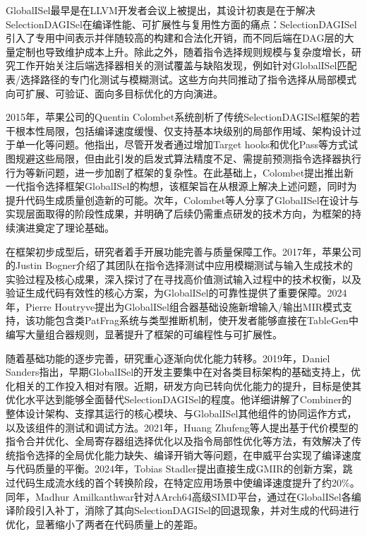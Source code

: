 \par

GlobalISel最早是在LLVM开发者会议上被提出，其设计初衷是在于解决SelectionDAGISel在编译性能、可扩展性与复用性方面的痛点：SelectionDAGISel引入了专用中间表示并伴随较高的构建和合法化开销，而不同后端在DAG层的大量定制也导致维护成本上升\cite{Colombet2015GlobalISel}。除此之外，随着指令选择规则规模与复杂度增长，研究工作开始关注后端选择器相关的测试覆盖与缺陷发现，例如针对GlobalISel匹配表/选择路径的专门化测试与模糊测试。这些方向共同推动了指令选择从局部模式向可扩展、可验证、面向多目标优化的方向演进\cite{rong2024irfuzzer}。

\par

2015年，苹果公司的Quentin Colombet系统剖析了传统SelectionDAGISel框架的若干根本性局限，包括编译速度缓慢、仅支持基本块级别的局部作用域、架构设计过于单一化等问题。他指出，尽管开发者通过增加Target hooks和优化Pass等方式试图规避这些局限，但由此引发的启发式算法精度不足、需提前预测指令选择器执行行为等新问题，进一步加剧了框架的复杂性。在此基础上，Colombet提出推出新一代指令选择框架GlobalISel的构想，该框架旨在从根源上解决上述问题，同时为提升代码生成质量创造新的可能\cite{Colombet2015GlobalISel}。次年，Colombet等人分享了GlobalISel在设计与实现层面取得的阶段性成果，并明确了后续仍需重点研发的技术方向\cite{Colombet2016GlobalISelDesign}，为框架的持续演进奠定了理论基础。

\par

在框架初步成型后，研究者着手开展功能完善与质量保障工作。2017年，苹果公司的Justin Bogner介绍了其团队在指令选择测试中应用模糊测试与输入生成技术的实验过程及核心成果，深入探讨了在寻找高价值测试输入过程中的技术权衡，以及验证生成代码有效性的核心方案\cite{Bogner2017ISelFuzzing}，为GlobalISel的可靠性提供了重要保障。2024年，Pierre Houtryve提出为GlobalISel组合器基础设施新增输入/输出MIR模式支持，该功能包含类PatFrag系统与类型推断机制，使开发者能够直接在TableGen中编写大量组合器规则\cite{Houtryve2024MIRPattern}，显著提升了框架的可编程性与可扩展性。

\par

随着基础功能的逐步完善，研究重心逐渐向优化能力转移。2019年，Daniel Sanders指出，早期GlobalISel的开发主要集中在对各类目标架构的基础支持上，优化相关的工作投入相对有限\cite{Sanders2019GlobalISelCombiner}。近期，研发方向已转向优化能力的提升，目标是使其优化水平达到能够全面替代SelectionDAGISel的程度。他详细讲解了Combiner的整体设计架构、支撑其运行的核心模块、与GlobalISel其他组件的协同运作方式，以及该组件的测试和调试方法。2021年，Huang Zhufeng等人提出基于代价模型的指令合并优化、全局寄存器组选择优化以及指令局部性优化等方法\cite{zhufeng2021optimization}，有效解决了传统指令选择的全局优化能力缺失、编译开销大等问题，在申威平台实现了编译速度与代码质量的平衡。2024年，Tobias Stadler提出直接生成GMIR的创新方案，跳过代码生成流水线的首个转换阶段，在特定应用场景中使编译速度提升了约20\%\cite{Stadler2024DirectGMIR}。同年，Madhur Amilkanthwar针对AArch64高级SIMD平台，通过在GlobalISel各编译阶段引入补丁，消除了其向SelectionDAGISel的回退现象，并对生成的代码进行优化，显著缩小了两者在代码质量上的差距\cite{Amilkanthwar2024AArch64GlobalISel}。

